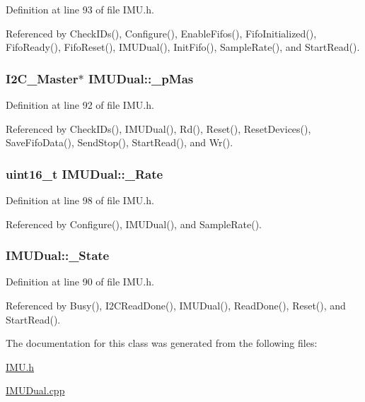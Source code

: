 Definition at line 93 of file IMU.h.



Referenced by CheckIDs(), Configure(), EnableFifos(), FifoInitialized(), FifoReady(), FifoReset(), IMUDual(), InitFifo(), SampleRate(), and StartRead().

\hypertarget{class_i_m_u_dual_a6e458f7bb91f9c057741019e42ae196d}{
\subsubsection[{\_\-pMas}]{\setlength{\rightskip}{0pt plus 5cm}I2C\_\-Master$\ast$ {\bf IMUDual::\_\-pMas}}}
\label{class_i_m_u_dual_a6e458f7bb91f9c057741019e42ae196d}


Definition at line 92 of file IMU.h.



Referenced by CheckIDs(), IMUDual(), Rd(), Reset(), ResetDevices(), SaveFifoData(), SendStop(), StartRead(), and Wr().

\hypertarget{class_i_m_u_dual_af258a53def9b232203afc862c03a69af}{
\subsubsection[{\_\-Rate}]{\setlength{\rightskip}{0pt plus 5cm}uint16\_\-t {\bf IMUDual::\_\-Rate}}}
\label{class_i_m_u_dual_af258a53def9b232203afc862c03a69af}


Definition at line 98 of file IMU.h.



Referenced by Configure(), IMUDual(), and SampleRate().

\hypertarget{class_i_m_u_dual_a6184224433fae8f33293b892f57cae3b}{
\subsubsection[{\_\-State}]{ {\bf IMUDual::\_\-State}}}
\label{class_i_m_u_dual_a6184224433fae8f33293b892f57cae3b}


Definition at line 90 of file IMU.h.



Referenced by Busy(), I2CReadDone(), IMUDual(), ReadDone(), Reset(), and StartRead().



The documentation for this class was generated from the following files:\begin{DoxyCompactItemize}
\item 
\hyperlink{_i_m_u_8h}{IMU.h}\item 
\hyperlink{_i_m_u_dual_8cpp}{IMUDual.cpp}\end{DoxyCompactItemize}
